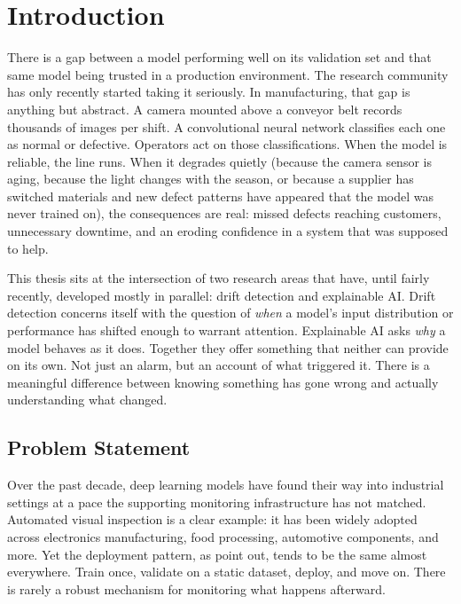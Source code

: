 
\chapter{Introduction}%
\label{ch:inleiding}

There is a gap between a model performing well on its validation set and that same model being trusted in a production environment. The research community has only recently started taking it seriously. In manufacturing, that gap is anything but abstract. A camera mounted above a conveyor belt records thousands of images per shift. A convolutional neural network classifies each one as normal or defective. Operators act on those classifications. When the model is reliable, the line runs. When it degrades quietly (because the camera sensor is aging, because the light changes with the season, or because a supplier has switched materials and new defect patterns have appeared that the model was never trained on), the consequences are real: missed defects reaching customers, unnecessary downtime, and an eroding confidence in a system that was supposed to help.

This thesis sits at the intersection of two research areas that have, until fairly recently, developed mostly in parallel: drift detection and explainable AI. Drift detection concerns itself with the question of \textit{when} a model's input distribution or performance has shifted enough to warrant attention. Explainable AI asks \textit{why} a model behaves as it does. Together they offer something that neither can provide on its own. Not just an alarm, but an account of what triggered it. There is a meaningful difference between knowing something has gone wrong and actually understanding what changed.

\section{Problem Statement}%
\label{sec:probleemstelling}

Over the past decade, deep learning models have found their way into industrial settings at a pace the supporting monitoring infrastructure has not matched. Automated visual inspection is a clear example: it has been widely adopted across electronics manufacturing, food processing, automotive components, and more. Yet the deployment pattern, as \textcite{Radhakrishnan2020} point out, tends to be the same almost everywhere. Train once, validate on a static dataset, deploy, and move on. There is rarely a robust mechanism for monitoring what happens afterward.

